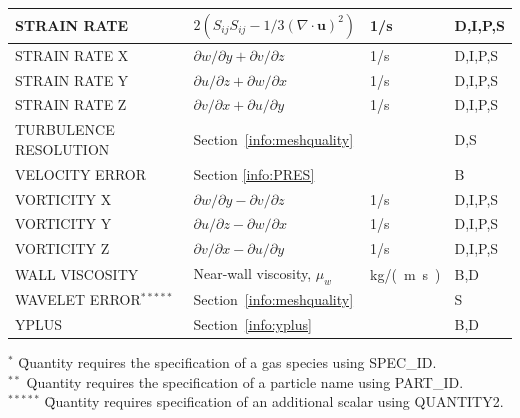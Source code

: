 \documentclass[11pt]{book}
\begin{document}
\begin{longtable}{@{\extracolsep{\fill}}|l|l|l|l|}
{\ct STRAIN RATE}                               & $2(S_{ij}S_{ij}-1/3(\nabla\cdot\mathbf{u})^2)$    & 1/s            & D,I,P,S      \\ \hline
{\ct STRAIN RATE X}                             & $\partial w/\partial y + \partial v/\partial z$   & 1/s            & D,I,P,S      \\ \hline
{\ct STRAIN RATE Y}                             & $\partial u/\partial z + \partial w/\partial x$   & 1/s            & D,I,P,S      \\ \hline
{\ct STRAIN RATE Z}                             & $\partial v/\partial x + \partial u/\partial y$   & 1/s            & D,I,P,S      \\ \hline
{\ct TURBULENCE RESOLUTION}                     & Section~\ref{info:meshquality}                    &                & D,S          \\ \hline
{\ct VELOCITY ERROR}                            & Section \ref{info:PRES}                           &                & B            \\ \hline
{\ct VORTICITY X}                               & $\partial w/\partial y - \partial v/\partial z$   & 1/s            & D,I,P,S      \\ \hline
{\ct VORTICITY Y}                               & $\partial u/\partial z - \partial w/\partial x$   & 1/s            & D,I,P,S      \\ \hline
{\ct VORTICITY Z}                               & $\partial v/\partial x - \partial u/\partial y$   & 1/s            & D,I,P,S      \\ \hline
{\ct WALL VISCOSITY}                            & Near-wall viscosity, $\mu_w$                      & \si{kg/(m.s)}  & B,D          \\ \hline
{\ct WAVELET ERROR}$^{*****}$                   & Section~\ref{info:meshquality}                    &                & S            \\ \hline
{\ct YPLUS}                                     & Section~\ref{info:yplus}                          &                & B,D          \\ \hline
\end{longtable}

\noindent
\begin{tabbing}
$^{*}$  \hspace{0.25in} \= Quantity requires the specification of a gas species using {\ct SPEC\_ID}. \\
$^{**}$                \> Quantity requires the specification of a particle name using {\ct PART\_ID}. \\
$^{*****}$ \hspace{0.25in} \=  Quantity requires specification of an additional scalar using {\ct QUANTITY2}. \
\end{tabbing}
\end{document}

